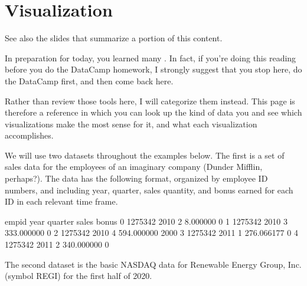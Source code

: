 \documentclass[letterpaper,10pt,english]{jupyterBook}
\begin{document}
\chapter{Visualization}
\label{\detokenize{chapter-10-visualization:visualization}}\label{\detokenize{chapter-10-visualization::doc}}
\sphinxAtStartPar
See also the slides that summarize a portion of this content.

\sphinxAtStartPar
In preparation for today, you learned many .  In fact, if you’re doing this reading before you do the DataCamp homework, I strongly suggest that you stop here, do the DataCamp first, and then come back here.

\sphinxAtStartPar
Rather than review those tools here, I will categorize them instead.  This page is therefore a reference in which you can look up the kind of data you  and see which visualizations make the most sense for it, and what each visualization accomplishes.

\sphinxAtStartPar
We will use two datasets throughout the examples below.  The first is a set of sales data for the employees of an imaginary company (Dunder Mifflin, perhaps?).  The data has the following format, organized by employee ID numbers, and including year, quarter, sales quantity, and bonus earned for each ID in each relevant time frame.

\begin{sphinxVerbatim}[commandchars=\\\{\}]
   
    
\end{sphinxVerbatim}

\begin{sphinxVerbatim}[commandchars=\\\{\}]
    emp\PYGZus{}id  year  quarter       sales  bonus
0  1275342  2010        2    8.000000      0
1  1275342  2010        3  333.000000      0
2  1275342  2010        4  594.000000   2000
3  1275342  2011        1  276.066177      0
4  1275342  2011        2  340.000000      0
\end{sphinxVerbatim}

\sphinxAtStartPar
The second dataset is the basic NASDAQ data for Renewable Energy Group, Inc. (symbol REGI) for the first half of 2020.
\end{document}
